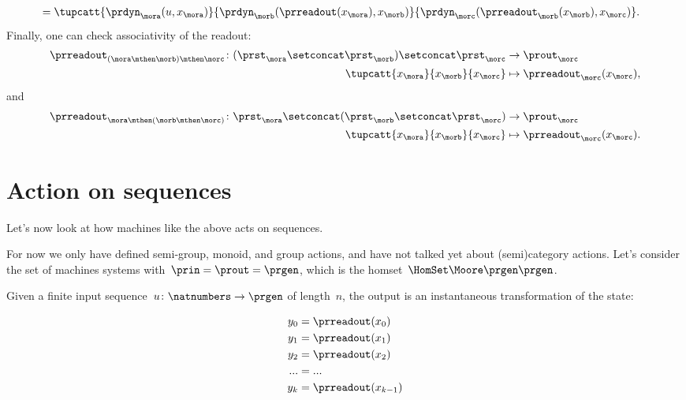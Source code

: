 \begin{solution}
\begin{equation*}
\begin{aligned}
  &=\tupcatt{\prdyn_\mora(u,x_\mora)}{\prdyn_\morb(\prreadout(x_\mora),x_\morb)}{\prdyn_\morc(\prreadout_\morb(x_\morb),x_\morc)}.
\end{aligned}
\end{equation*}
  Finally, one can check associativity of the readout:
  \begin{equation*}
    \label{eq:assoc_moore_3}
    \begin{aligned}
      \prreadout_{(\mora \mthen \morb)\mthen \morc}\colon (\prst_\mora \setconcat \prst_\morb)\setconcat \prst_\morc &\to \prout_\morc\\
      \tupcatt{x_\mora}{x_\morb}{x_\morc} &\mapsto \prreadout_\morc(x_\morc),
\end{aligned}
\end{equation*}
  and
    \begin{equation*}
    \label{eq:assoc_moore_4}
    \begin{aligned}
      \prreadout_{\mora \mthen (\morb\mthen \morc)}\colon \prst_\mora \setconcat (\prst_\morb\setconcat \prst_\morc) &\to \prout_\morc\\
      \tupcatt{x_\mora}{x_\morb}{x_\morc} &\mapsto \prreadout_\morc(x_\morc).
\end{aligned}
\end{equation*}
\end{solution}
\section{Action on sequences}

Let's now look at how machines like the above acts on sequences.

For now we only have defined semi-group, monoid, and group actions, and have not talked yet about (semi)category actions.
Let's consider the set of machines systems with~$\prin = \prout = \prgen$, which is the homset~$\HomSet\Moore\prgen\prgen$.

Given a finite input sequence~$u\colon \natnumbers \to \prgen$ of length~$n$, the output is an instantaneous transformation of the state:

\begin{equation}\label{eq:actions-on-sequences-y}
  \begin{aligned}
  y_0 &= \prreadout(x_0) \\
  y_1 &= \prreadout(x_1) \\
  y_2 &= \prreadout(x_2) \\
  ... &= ...  \\
  y_{k} &= \prreadout(x_{k-1})
\end{aligned}
\end{equation}

